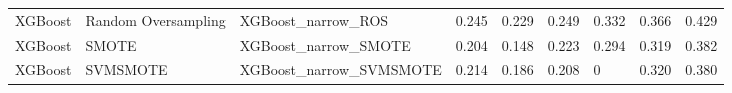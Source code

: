 \begin{tabular}{lllllllll}
                     XGBoost & Random Oversampling &                           XGBoost\_narrow\_ROS & 0.245 &                     0.229 &                 0.249 &                  0.332 &                                   0.366 &     0.429 \\
                     XGBoost &               SMOTE &                         XGBoost\_narrow\_SMOTE & 0.204 &                     0.148 &                 0.223 &                  0.294 &                                   0.319 &     0.382 \\
                     XGBoost &            SVMSMOTE &                      XGBoost\_narrow\_SVMSMOTE & 0.214 &                     0.186 &                 0.208 &                      0 &                                   0.320 &     0.380 \\
\bottomrule
\end{tabular}
